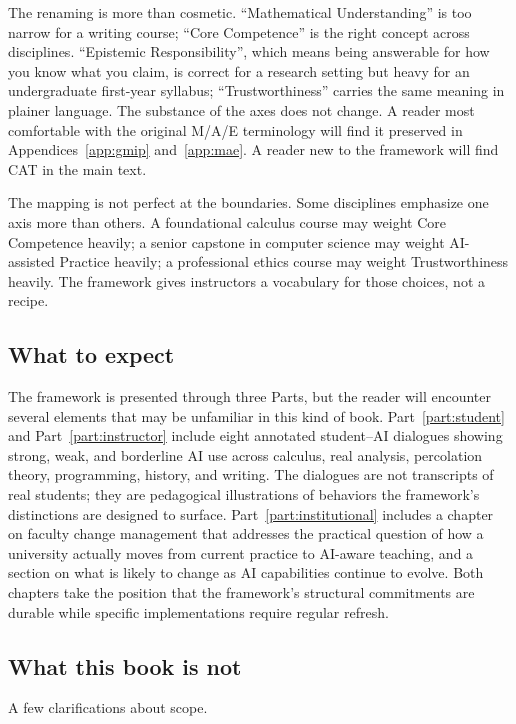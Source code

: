 \documentclass{SIAMbook2023}
\begin{document}
\begin{thepreface}
The renaming is more than cosmetic. ``Mathematical Understanding'' is too narrow for a writing course; ``Core Competence'' is the right concept across disciplines. ``Epistemic Responsibility'', which means being answerable for how you know what you claim, is correct for a research setting but heavy for an undergraduate first-year syllabus; ``Trustworthiness'' carries the same meaning in plainer language. The substance of the axes does not change. A reader most comfortable with the original M/A/E terminology will find it preserved in Appendices~\ref{app:gmip} and~\ref{app:mae}. A reader new to the framework will find CAT in the main text.

The mapping is not perfect at the boundaries. Some disciplines emphasize one axis more than others. A foundational calculus course may weight Core Competence heavily; a senior capstone in computer science may weight AI-assisted Practice heavily; a professional ethics course may weight Trustworthiness heavily. The framework gives instructors a vocabulary for those choices, not a recipe.

\subsection*{What to expect}

The framework is presented through three Parts, but the reader will encounter several elements that may be unfamiliar in this kind of book. Part~\ref{part:student} and Part~\ref{part:instructor} include eight annotated student--AI dialogues showing strong, weak, and borderline AI use across calculus, real analysis, percolation theory, programming, history, and writing. The dialogues are not transcripts of real students; they are pedagogical illustrations of behaviors the framework's distinctions are designed to surface. Part~\ref{part:institutional} includes a chapter on faculty change management that addresses the practical question of how a university actually moves from current practice to AI-aware teaching, and a section on what is likely to change as AI capabilities continue to evolve. Both chapters take the position that the framework's structural commitments are durable while specific implementations require regular refresh.

\subsection*{What this book is not}

A few clarifications about scope.


\end{thepreface}
\end{document}
